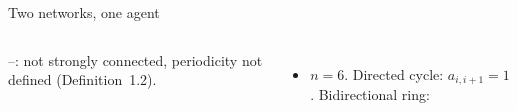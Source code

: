 \documentclass[10pt, aspectratio=169]{beamer}
\begin{document}
\begin{frame}[label=m-networks]{Two networks, one agent}
\begin{columns}[T]
{      \smallskip
      --: not strongly connected, periodicity not defined (Definition~1.2).}
      \small
      \begin{itemize}
        \item $n = 6$. Directed cycle: $a_{i,i+1} = 1$. Bidirectional ring:

\end{itemize}
\end{columns}
\end{frame}
\end{document}

